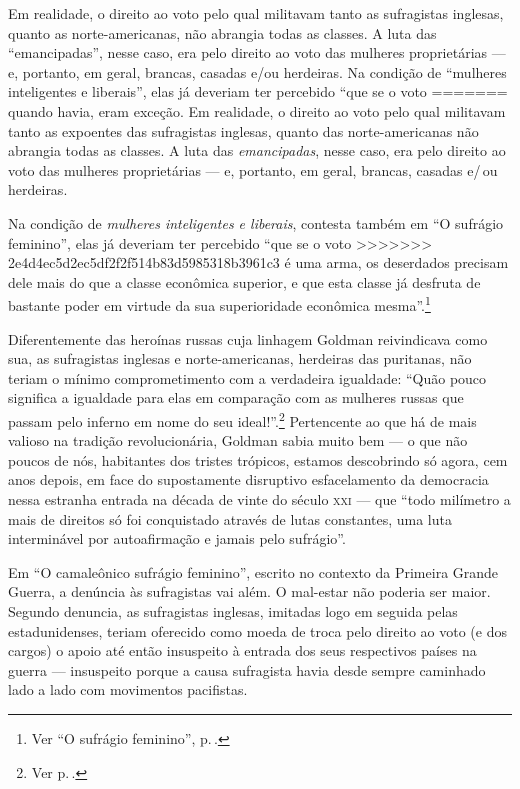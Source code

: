 Em realidade, o direito ao voto pelo qual
militavam tanto as sufragistas inglesas, quanto as
norte-americanas, não abrangia todas as classes. A luta das
``emancipadas'', nesse caso, era pelo direito ao voto das mulheres
proprietárias --- e, portanto, em geral, brancas, casadas e/ou herdeiras.
Na condição de ``mulheres inteligentes e liberais'', elas já deveriam ter percebido ``que se o voto
=======
quando havia, eram exceção. Em realidade, o direito ao voto pelo qual
militavam tanto as expoentes das sufragistas inglesas, quanto das
norte-americanas não abrangia todas as classes. A luta das
\textit{emancipadas}, nesse caso, era pelo direito ao voto das mulheres
proprietárias --- e, portanto, em geral, brancas, casadas e/\,ou herdeiras.

Na condição de \textit{mulheres inteligentes e liberais}, contesta também em
``O sufrágio feminino'', elas já deveriam ter percebido ``que se o voto
>>>>>>> 2e4d4ec5d2ec5df2f2f514b83d5985318b3961c3
é uma arma, os deserdados precisam dele mais do que a classe econômica
superior, e que esta classe já desfruta de bastante poder em virtude da
sua superioridade econômica mesma''.\footnote{Ver ``O sufrágio feminino'', p.\,\pageref{virtude}.}

Diferentemente das heroínas russas
cuja linhagem Goldman reivindicava como sua, as sufragistas inglesas e
norte-americanas, herdeiras das puritanas, não teriam o mínimo
comprometimento com a verdadeira igualdade: ``Quão pouco significa a
igualdade para elas em comparação com as mulheres russas que passam pelo
inferno em nome do seu ideal!''.\footnote{Ver p.\,\pageref{russas}.} Pertencente ao que há de mais valioso na
tradição revolucionária, Goldman sabia muito bem --- o que não poucos de
nós, habitantes dos tristes trópicos, estamos descobrindo só agora, cem
anos depois, em face do supostamente disruptivo esfacelamento da
democracia nessa estranha entrada na década de vinte do século
\textsc{xxi} --- que ``todo milímetro a mais de direitos só foi conquistado através
de lutas constantes, uma luta interminável por autoafirmação e jamais
pelo sufrágio''.

Em ``O camaleônico sufrágio feminino'', escrito no contexto da Primeira
Grande Guerra, a denúncia às sufragistas vai além. O mal-estar não
poderia ser maior. Segundo denuncia, as sufragistas inglesas, imitadas
logo em seguida pelas estadunidenses, teriam oferecido como moeda de
troca pelo direito ao voto (e dos cargos) o apoio até então insuspeito à
entrada dos seus respectivos países na guerra --- insuspeito porque
a causa sufragista havia desde sempre caminhado lado a lado com movimentos
pacifistas.


